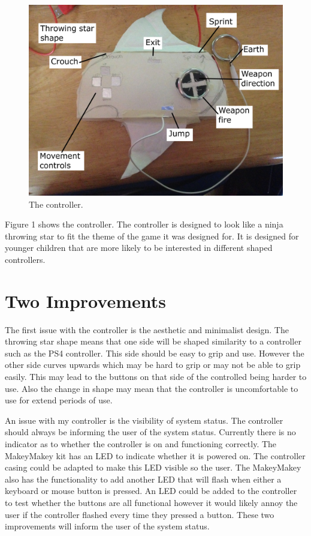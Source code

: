 \documentclass{scrartcl}
\begin{document}
\begin{figure}[h]
	\includegraphics[width=1.0\linewidth]{Controller.jpg}
	\caption{ The controller.}
\end{figure}
Figure 1 shows the controller. The controller is designed to look like a ninja throwing star to fit the theme of the game it was designed for. It is designed for younger children that are more likely to be interested in different shaped controllers.


\section{Two Improvements}

The first issue with the controller is the aesthetic and minimalist design. The throwing star shape means that one side will be shaped similarity to a controller such as the PS4 controller. This side should be easy to grip and use. However the other side curves upwards which may be hard to grip or may not be able to grip easily. This may lead to the buttons on that side of the controlled being harder to use. Also the change in shape may mean that the controller is uncomfortable to use for extend periods of use.

An issue with my controller is the visibility of system status. The controller should always be informing the user of the system status. Currently there is no indicator as to whether the controller is on and functioning correctly. The MakeyMakey kit has an LED to indicate whether it is powered on. The controller casing could be adapted to make this LED visible so the user. The MakeyMakey also has the functionality to add another LED that will flash when either a keyboard or mouse button is pressed. An LED could be added to the controller to test whether the buttons are all functional however it would likely annoy the user if the controller flashed every time they pressed a button. These two improvements will inform the user of the system status. 
\end{document}
